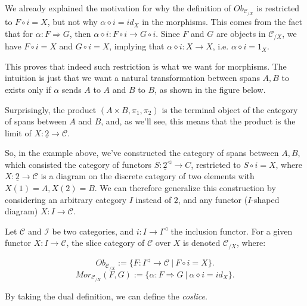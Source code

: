\begin{example}
  We already explained the motivation for why the definition of $Ob_{\mathcal C_{/X}}$
  is restricted to $F\circ i = X$,
  but not why $\alpha \diamond i = id_{X}$ in the morphisms. This comes from the fact
  that for $\alpha:F \Rightarrow G$, then
  $\alpha \diamond i: F \circ i \to G \circ i$. Since
  $F$ and $G$ are objects in $\mathcal C_{/X}$, we have
  $F \circ i = X$ and $G \circ i = X$, implying that
  $\alpha \diamond i: X \to X$, i.e. $\alpha \diamond i = 1_{X}$.

  This proves that indeed such restriction is what we want for morphisms. The intuition
  is just that we want a natural transformation between spans $A, B$ to exists
  only if $\alpha$ sends $A$ to $A$ and $B$ to $B$, as shown in the figure below.

  Surprisingly, the product $(A\times B, \pi_1, \pi_2)$ is the terminal object
  of the category of spans between $A$ and $B$, and, as we'll see, this means
  that the product is the limit of $X:\underline{2} \to \mathcal C$.
\end{example}

So, in the example above, we've constructed the category of spans between $A,B$,
which consisted the category of functors $S:\underline{2}^\lhd \to C$, restricted
to $S \circ i = X$, where $X: \underline{2}\to \mathcal C$ is a diagram
on the discrete category of two elements with $X(1) = A, X(2) = B$.
We can therefore generalize this construction
by considering an arbitrary category $I$ instead of $\underline{2}$,
and any functor ($I$-shaped diagram) $X:I\to \mathcal C$.

\begin{definition}
  Let $\mathcal C$ and $\mathcal I$ be two categories, and $i:I \to I^{\lhd}$ the
  inclusion functor. For a given functor $X:I \to \mathcal C$, the slice category
  of $\mathcal C$ over $X$ is denoted $\mathcal C_{/X}$, where:

  \begin{displaymath}
    Ob_{\mathcal C_{/ X}}:=\{
      F: I^\lhd \to \mathcal C \ | \ F \circ i = X
    \}.
  \end{displaymath}
  \begin{displaymath}
    Mor_{\mathcal C_{/X}}(F,G):=\{
      \alpha: F \Rightarrow G \ | \ \alpha \diamond i = id_{X}
    \}.
  \end{displaymath}
\end{definition}

By taking the dual definition, we can define the \textit{coslice}.

